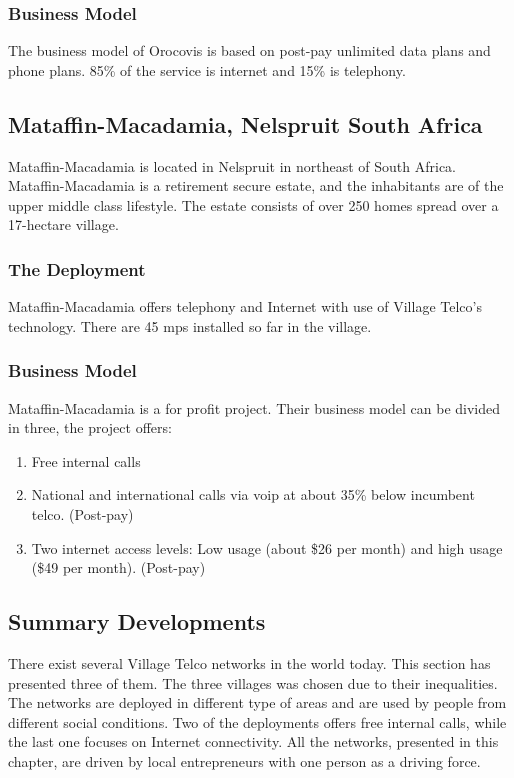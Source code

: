 \subsubsection{Business Model}
The business model of Orocovis is based on post-pay unlimited data plans and phone plans. 85\% of the service is internet and 15\% is telephony. 

\subsection{Mataffin-Macadamia, Nelspruit South Africa}
Mataffin-Macadamia is located in Nelspruit in northeast of South Africa. Mataffin-Macadamia is a retirement secure estate, and the inhabitants are of the upper middle class lifestyle. The estate consists of over 250 homes spread over a 17-hectare village. 

\subsubsection{The Deployment}
Mataffin-Macadamia offers telephony and Internet with use of Village Telco's technology\cite{mataffin_ict}. There are 45 \glspl{mp} installed so far in the village.

\subsubsection{Business Model}
Mataffin-Macadamia is a for profit project. Their business model can be divided in three, the project offers: 
\begin{enumerate}
\item Free internal calls
\item National and international calls via \gls{voip} at about 35\% below incumbent telco. (Post-pay)
\item Two internet access levels: Low usage (about \$26 per month) and high usage (\$49 per month). (Post-pay)
\end{enumerate}

\subsection{Summary Developments}
There exist several Village Telco networks in the world today. This section has presented three of them. The three villages was chosen due to their inequalities. The networks are deployed in different type of areas and are used by people from different social conditions. Two of the deployments offers free internal calls, while the last one focuses on Internet connectivity. All the networks, presented in this chapter, are driven by local entrepreneurs with one person as a driving force.


